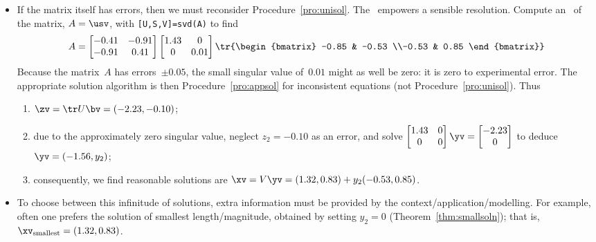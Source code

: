\begin{example}
\begin{solution}
\begin{itemize}
\item If the matrix itself has errors, then we must reconsider Procedure~\ref{pro:unisol}.
The \svd\ empowers a sensible resolution.
Compute an \svd\ of the matrix, \(A=\usv\), with \verb|[U,S,V]=svd(A)| to find \twodp
\setbox\ajrqrbox\hbox{}%
\marginpar{\usebox{\ajrqrbox\\[2ex]}}%
\begin{equation*}
A=\begin{bmatrix} -0.41 & -0.91
\\-0.91 &  0.41 \end{bmatrix}
\begin{bmatrix} 1.43 & 0
\\0 &  0.01 \end{bmatrix}
\tr{\begin{bmatrix} -0.85 & -0.53
\\-0.53 &  0.85 \end{bmatrix}}
\end{equation*}
Because the matrix~\(A\) has errors~\(\pm0.05\), the small singular value of~\(0.01\) might as well be zero: it is zero to experimental error.
The appropriate solution algorithm is then Procedure~\ref{pro:appsol} for inconsistent equations (not Procedure~\ref{pro:unisol}).
Thus \twodp
\begin{enumerate}
\item \(\zv=\tr U\bv=(-2.23,-0.10)\);
\item due to the approximately zero singular value, neglect \(z_2=-0.10\) as an error, and solve
\(\begin{bmatrix} 1.43 & 0
\\0 &  0 \end{bmatrix}\yv=\begin{bmatrix} -2.23\\0 \end{bmatrix}\)
to deduce \(\yv=(-1.56,y_2)\);
\item consequently, we find reasonable solutions are \(\xv=V\yv=(1.32,0.83)+y_2(-0.53,0.85)\).
\end{enumerate}
\item To choose between this infinitude of solutions, extra information must be provided by the context\slash application\slash modelling.  For example, often one prefers the solution of smallest length\slash magnitude, obtained by setting \(y_2=0\) (Theorem~\ref{thm:smallsoln}); that is, \(\xv_{\text{smallest}}=(1.32,0.83)\).
\end{itemize}
\end{solution}
\end{example}




